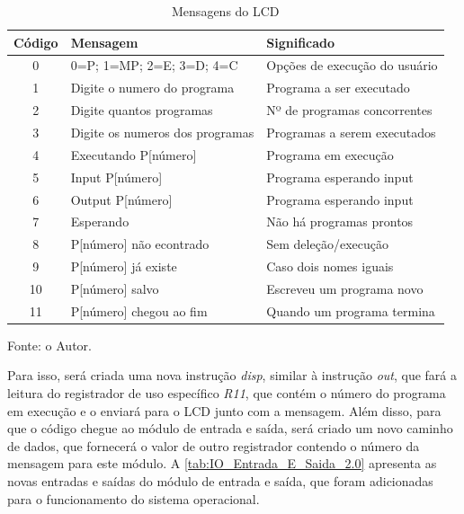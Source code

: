 \documentclass[
	12pt,				%
	oneside,
	a4paper,			%
	english,			%
	french,				%
	spanish,			%
	brazil,				%
	]{abntex2}
\begin{document}
\setlength{\tabcolsep}{10pt}
\begin{table}[H]
\centering
\caption{Mensagens do LCD}
\label{tab:mensagens do LCD}
\begin{tabular}{|c|l|l|}
\hline
\textbf{Código} & \textbf{Mensagem} & \textbf{Significado} \\
\hline
0 & 0=P; 1=MP; 2=E; 3=D; 4=C & Opções de execução do usuário \\
\hline
1 & Digite o numero do programa & Programa a ser executado \\
\hline
2 & Digite quantos programas & Nº de programas concorrentes \\
\hline
3 & Digite os numeros dos programas & Programas a serem executados \\ 
\hline
4 & Executando P[número] & Programa em execução \\
\hline
5 & Input P[número] & Programa esperando input \\
\hline
6 & Output P[número] & Programa esperando input \\
\hline
7 & Esperando & Não há programas prontos \\
\hline
8 & P[número] não econtrado & Sem deleção/execução \\
\hline
9 & P[número] já existe & Caso dois nomes iguais \\
\hline
10 & P[número] salvo & Escreveu um programa novo \\
\hline
11 & P[número] chegou ao fim & Quando um programa termina \\
\hline
\end{tabular}
\vspace{-0.5em}
\begin{center}
Fonte: o Autor.
\end{center}
\end{table}

Para isso, será criada uma nova instrução \textit{disp}, similar à instrução \textit{out}, que fará a leitura do registrador de uso específico \textit{R11}, que contém o número do programa em execução e o enviará para o LCD junto com a mensagem. Além disso, para que o código chegue ao módulo de entrada e saída, será criado um novo caminho de dados, que fornecerá o valor de outro registrador contendo o número da mensagem para este módulo. A \autoref{tab:IO_Entrada_E_Saida_2.0} apresenta as novas entradas e saídas do módulo de entrada e saída, que foram adicionadas para o funcionamento do sistema operacional.
\end{document}
